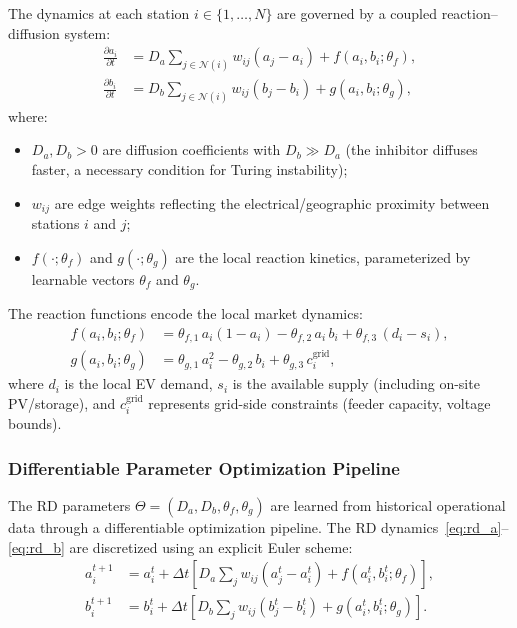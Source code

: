 \documentclass[review]{elsarticle}
\begin{document}
\hspace{0.5cm}The dynamics at each station $i \in \{1,\ldots,N\}$ are governed by a coupled reaction--diffusion system:
\begin{align}
    \frac{\partial a_i}{\partial t} &= D_a \sum_{j \in \mathcal{N}(i)} w_{ij}(a_j - a_i) + f(a_i, b_i; \theta_f), \label{eq:rd_a} \\
    \frac{\partial b_i}{\partial t} &= D_b \sum_{j \in \mathcal{N}(i)} w_{ij}(b_j - b_i) + g(a_i, b_i; \theta_g), \label{eq:rd_b}
\end{align}
where:
\begin{itemize}
    \item $D_a, D_b > 0$ are diffusion coefficients with $D_b \gg D_a$ (the inhibitor diffuses faster, a necessary condition for Turing instability);
    \item $w_{ij}$ are edge weights reflecting the electrical/geographic proximity between stations $i$ and $j$;
    \item $f(\cdot; \theta_f)$ and $g(\cdot; \theta_g)$ are the local reaction kinetics, parameterized by learnable vectors $\theta_f$ and $\theta_g$.
\end{itemize}

\hspace{0.5cm}The reaction functions encode the local market dynamics:
\begin{align}
    f(a_i, b_i; \theta_f) &= \theta_{f,1}\, a_i(1 - a_i) - \theta_{f,2}\, a_i\, b_i + \theta_{f,3}\,(d_i - s_i), \label{eq:f_reaction} \\
    g(a_i, b_i; \theta_g) &= \theta_{g,1}\, a_i^2 - \theta_{g,2}\, b_i + \theta_{g,3}\, c_i^{\text{grid}}, \label{eq:g_reaction}
\end{align}
where $d_i$ is the local EV demand, $s_i$ is the available supply (including on-site PV/storage), and $c_i^{\text{grid}}$ represents grid-side constraints (feeder capacity, voltage bounds).

\subsubsection{Differentiable Parameter Optimization Pipeline}

\hspace{0.5cm}The RD parameters $\Theta = (D_a, D_b, \theta_f, \theta_g)$ are learned from historical operational data through a differentiable optimization pipeline. The RD dynamics~\eqref{eq:rd_a}--\eqref{eq:rd_b} are discretized using an explicit Euler scheme:
\begin{align}
    a_i^{t+1} &= a_i^t + \Delta t \left[ D_a \sum_{j} w_{ij}(a_j^t - a_i^t) + f(a_i^t, b_i^t; \theta_f) \right], \\
    b_i^{t+1} &= b_i^t + \Delta t \left[ D_b \sum_{j} w_{ij}(b_j^t - b_i^t) + g(a_i^t, b_i^t; \theta_g) \right].
\end{align}
\end{document}
